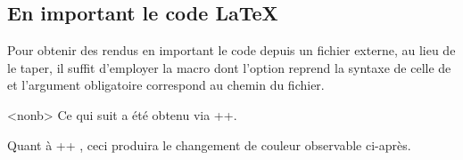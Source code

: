 \documentclass[10pt, a4paper]{article}
\begin{document}

\subsection{En important le code \LaTeX}

Pour obtenir des rendus en important le code depuis un fichier externe, au lieu de le taper, il suffit d'employer la macro  dont l'option reprend la syntaxe de celle de  et l'argument obligatoire correspond au chemin du fichier.

\begin{bdocexa}<nonb>
    Ce qui suit a été obtenu via \bdocinlatex++.

    \medskip


    \medskip

    Quant à \bdocinlatex++ , ceci produira le changement de couleur observable ci-après.

    \medskip

\end{bdocexa}
\end{document}
